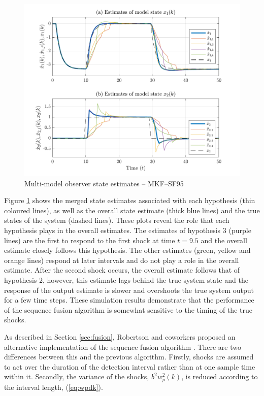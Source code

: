 \begin{figure}[htp]
	\centering
	\includegraphics[width=13cm]{images/rod_MKF_test_sim_MKF_SF95_x_est.pdf}
	\caption{Multi-model observer state estimates – MKF--SF95}
	\label{fig:rod-obs-sim-test-x_est-SF95}
\end{figure}
Figure \ref{fig:rod-obs-sim-test-x_est-SF95} shows the merged state estimates associated with each hypothesis (thin coloured lines), as well as the overall state estimate (thick blue lines) and the true states of the system (dashed lines). These plots reveal the role that each hypothesis plays in the overall estimates. The estimates of hypothesis 3 (purple lines) are the first to respond to the first shock at time $t=9.5$ and the overall estimate closely follows this hypothesis. The other estimates (green, yellow and orange lines) respond at later intervals and do not play a role in the overall estimate. After the second shock occurs, the overall estimate follows that of hypothesis 2, however, this estimate lags behind the true system state and the response of the output estimate is slower and overshoots the true system output for a few time steps. These simulation results demonstrate that the performance of the sequence fusion algorithm is somewhat sensitive to the timing of the true shocks.

As described in Section \ref{sec:fusion}, Robertson and coworkers proposed an alternative implementation of the sequence fusion algorithm \citep{robertson_method_1998}. There are two differences between this and the previous algorithm. Firstly, shocks are assumed to act over the duration of the detection interval rather than at one sample time within it. Secondly, the variance of the shocks, $b^2w_{p}^2(k)$, is reduced according to the interval length, (\ref{eq:wpdk}).

